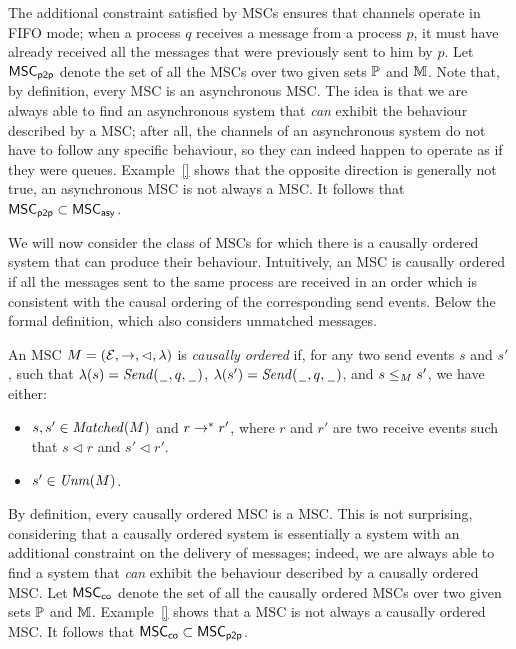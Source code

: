 \documentclass{article}
\begin{document}
The additional constraint satisfied by \pp MSCs ensures that channels operate in FIFO mode; when a process $q$ receives a message from a process $p$, it must have already received all the messages that were previously sent to him by $p$. Let $\mathsf{MSC}_{\mathsf{p2p}}$ denote the set of all the \pp MSCs over two given sets $\mathbb{P}$ and $\mathbb{M}$. Note that, by definition, every \pp MSC is an asynchronous MSC. The idea is that we are always able to find an asynchronous system that \emph{can} exhibit the behaviour described by a \pp MSC; after all, the channels of an asynchronous system do not have to follow any specific behaviour, so they can indeed happen to operate as if they were queues. Example~\ref{} shows that the opposite direction is generally not true, an asynchronous MSC is not always a \pp MSC. It follows that $\mathsf{MSC}_{\mathsf{p2p}} \subset \mathsf{MSC}_{\mathsf{asy}}$.

\medskip

We will now consider the class of MSCs for which there is a causally ordered system that can produce their behaviour. Intuitively, an MSC is causally ordered if all the messages sent to the same process are received in an order which is consistent with the causal ordering of the corresponding send events. Below the formal definition, which also considers unmatched messages.
\begin{definition}
An MSC $M = (\mathcal{E},\to,\lhd,\lambda)$ is \emph{causally ordered} if, for any two send events $s$ and $s'$, such that $\lambda(s)={\mathit{Send}(\hspace{0.1em}\underline{\hspace{0.5em}}\hspace{0.1em},q,\hspace{0.1em}\underline{\hspace{0.5em}}\hspace{0.1em})}$, $\lambda(s')={\mathit{Send}(\hspace{0.1em}\underline{\hspace{0.5em}}\hspace{0.1em},q,\hspace{0.1em}\underline{\hspace{0.5em}}\hspace{0.1em})}$, and $s \le_M s'$, we have either:
\begin{itemize}\itemsep=0.5ex
	\item $s,s' \in \mathit{Matched}(M)$ and $r \to^* r'$, where $r$ and $r'$ are two receive events such that $s \lhd r$ and $s' \lhd r'$.
	\item $s' \in \mathit{Unm}(M)$.
\end{itemize}
\end{definition}

By definition, every causally ordered MSC is a \pp MSC. This is not surprising, considering that a causally ordered system is essentially a \pp system with an additional constraint on the delivery of messages; indeed, we are always able to find a \pp system that \emph{can} exhibit the behaviour described by a causally ordered MSC. Let $\mathsf{MSC}_{\mathsf{co}}$ denote the set of all the causally ordered MSCs over two given sets $\mathbb{P}$ and $\mathbb{M}$. Example~\ref{} shows that a \pp MSC is not always a causally ordered MSC. It follows that $\mathsf{MSC}_{\mathsf{co}} \subset \mathsf{MSC}_{\mathsf{p2p}}$.
\end{document}
